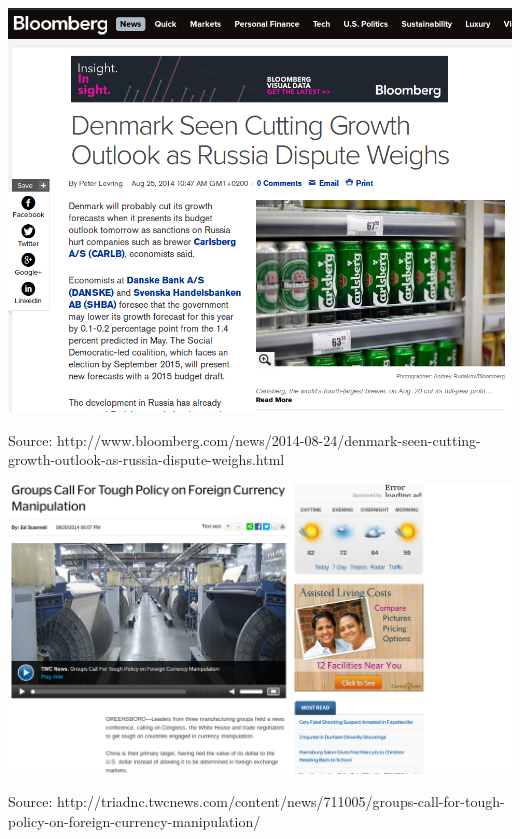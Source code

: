 \documentclass[ignorenonframetext,]{beamer}
\begin{document}
\begin{frame}

    \includegraphics[scale=0.3]{carlsberg_political.png}

    {\tiny Source: http://www.bloomberg.com/news/2014-08-24/denmark-seen-cutting-growth-outlook-as-russia-dispute-weighs.html }

\end{frame}

\begin{frame}

    \includegraphics[scale=0.3]{currency_manipulation.png}

    {\tiny Source: http://triadnc.twcnews.com/content/news/711005/groups-call-for-tough-policy-on-foreign-currency-manipulation/}

\end{frame}
\end{document}
